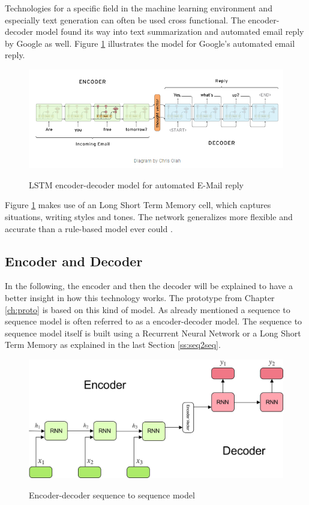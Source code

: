 Technologies for a specific field in the machine learning environment and especially text generation can often be used cross functional. The encoder-decoder model found its way into text summarization and automated email reply by Google \cite{google} as well. Figure \ref{enc-dec} illustrates the model for Google's automated email reply.

\begin{figure}
	\begin{center}
		\includegraphics[width=5.5in]{photos/encoder_decoder}\\
		\caption{LSTM encoder-decoder model for automated E-Mail reply}\label{enc-dec}
	\end{center}
\end{figure}

Figure \ref{enc-dec} makes use of an Long Short Term Memory cell, which captures situations, writing styles and tones. The network generalizes more flexible and accurate than a rule-based model ever could \cite{google}. 


\subsection{Encoder and Decoder}\label{ss:encdec}

In the following, the encoder and then the decoder will be explained to have a better insight in how this technology works. The prototype from Chapter \ref{ch:proto} is based on this kind of model. As already mentioned a sequence to sequence model is often referred to as a encoder-decoder model. The sequence to sequence model itself is built using a Recurrent Neural Network or a Long Short Term Memory as explained in the last Section \ref{ss:seq2seq}.

\begin{figure}
	\begin{center}
		\includegraphics[width=4.5in]{photos/encoderdecoder.jpeg}\\
		\caption{Encoder-decoder sequence to sequence model \cite{encdec}}\label{encdecseq}
	\end{center}
\end{figure}

